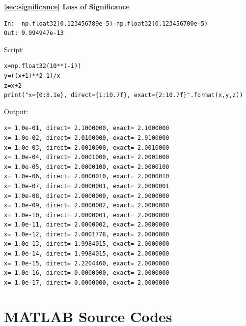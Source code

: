 \bigskip
\textbf{\ref{sec:significance} Loss of Significance}

\small
\begin{mybox}
	\begin{verbatim}
In:  np.float32(0.123456789e-5)-np.float32(0.123456700e-5)
Out: 9.094947e-13
   \end{verbatim}
\end{mybox}
\normalsize

\newpage
\noindent
\begin{example}
	
\small
\begin{mybox}
Script:
\begin{verbatim}
x=np.float32(10**(-i))
y=((x+1)**2-1)/x
z=x+2
print("x={0:8.1e}, direct={1:10.7f}, exact={2:10.7f}".format(x,y,z))
\end{verbatim}

\medskip
Output:
\begin{verbatim}
x= 1.0e-01, direct= 2.1000000, exact= 2.1000000
x= 1.0e-02, direct= 2.0100000, exact= 2.0100000
x= 1.0e-03, direct= 2.0010000, exact= 2.0010000
x= 1.0e-04, direct= 2.0001000, exact= 2.0001000
x= 1.0e-05, direct= 2.0000100, exact= 2.0000100
x= 1.0e-06, direct= 2.0000010, exact= 2.0000010
x= 1.0e-07, direct= 2.0000001, exact= 2.0000001
x= 1.0e-08, direct= 2.0000000, exact= 2.0000000
x= 1.0e-09, direct= 2.0000002, exact= 2.0000000
x= 1.0e-10, direct= 2.0000001, exact= 2.0000000
x= 1.0e-11, direct= 2.0000002, exact= 2.0000000
x= 1.0e-12, direct= 2.0001778, exact= 2.0000000
x= 1.0e-13, direct= 1.9984015, exact= 2.0000000
x= 1.0e-14, direct= 1.9984015, exact= 2.0000000
x= 1.0e-15, direct= 2.2204460, exact= 2.0000000
x= 1.0e-16, direct= 0.0000000, exact= 2.0000000
x= 1.0e-17, direct= 0.0000000, exact= 2.0000000
\end{verbatim}
\end{mybox}
\normalsize
\end{example}

\bigskip
\noindent
\section*{MATLAB Source Codes}
\setcounter{program}{0}
\noindent
\program\label{matlab:machine_epsilon}

